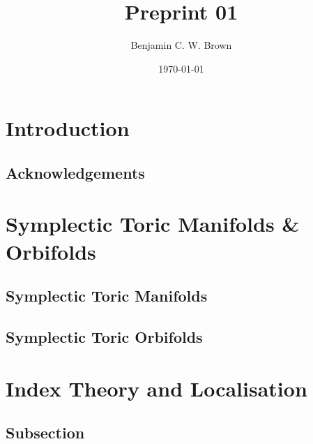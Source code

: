 \documentclass[11pt]{amsart}
\title{Preprint 01}
\author{Benjamin C. W. Brown}
\date{\today}
\begin{document}
\begin{abstract}

\end{abstract}

\maketitle

\section{Introduction}

\subsection*{Acknowledgements}  

\section{Symplectic Toric Manifolds \& Orbifolds} \label{sec:symplectic-toric-manifolds-orbifolds}

\subsection{Symplectic Toric Manifolds} \label{subsec:toric-manifolds}

\subsection{Symplectic Toric Orbifolds} \label{subsec:toric-orbifolds}



\section{Index Theory and Localisation} \label{sec:index-theory-localisation}


\subsection{Subsection} %



\providecommand{\bysame}{\leavevmode\hbox to3em{\hrulefill}\thinspace}
\providecommand{\href}[2]{#2}
\begin{thebibliography}{LMTW98}



\end{thebibliography}
\end{document}
